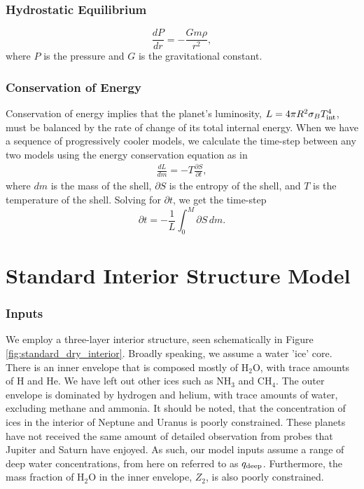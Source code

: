 \documentclass[11pt]{ucscthesisbs}
\begin{document}
\subsubsection{Hydrostatic Equilibrium}
\begin{equation}
  \frac{dP}{dr} = -\frac{Gm\rho}{r^{2}}  ,
\end{equation}
where $P$ is the pressure and $G$ is the gravitational constant. 
\subsubsection{Conservation of Energy}
Conservation of energy implies that the planet's luminosity, $L = 4\pi R^2\sigma_{B}T_{\rm int}^4$, 
must be balanced by the rate of change of its total internal energy. When we have a sequence of progressively cooler models, we calculate the time-step between any two models using the energy conservation equation as in \citep{fortney_2011}
\begin{align}
\frac{dL}{dm}= -T\frac{\partial S}{\partial t},
\label{eq:energy_conservation}
\end{align}
where $dm$ is the mass of the shell, $\partial S$ is the entropy of the shell, and $T$ is the temperature of the shell. Solving for $\partial t$, we get the time-step
\begin{equation}
\partial t = -\frac{1}{L} \int_{0}^{M} \partial S \,dm .
\label{eq:timestep}
\end{equation}

\section{Standard Interior Structure Model}
\subsubsection{Inputs}
We employ a three-layer interior structure, seen schematically in Figure \ref{fig:standard_dry_interior}. Broadly speaking, we assume a water 'ice' core. There is an inner envelope that is composed mostly of H$_{2}$O, with trace amounts of H and He. We have left out other ices such as NH$_{3}$ and CH$_{4}$. The outer envelope is dominated by hydrogen and helium, with trace amounts of water, excluding methane and ammonia. It should be noted, that the concentration of ices in the interior of Neptune and Uranus is poorly constrained. These planets have not received the same amount of detailed observation from probes that Jupiter and Saturn have enjoyed. As such, our model inputs assume a range of deep water concentrations, from here on referred to as $q_{\rm deep}$. Furthermore, the mass fraction of H$_{2}$O in the inner envelope, $Z_{2}$, is also poorly constrained. 
\end{document}
